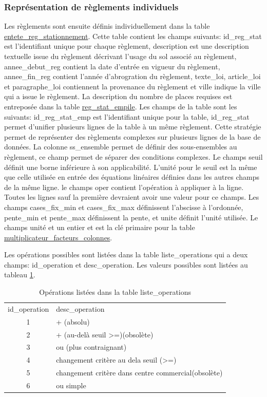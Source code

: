     \subsubsection{Représentation de règlements individuels} 
    Les règlements sont ensuite définis individuellement dans la table \underline{entete\_reg\_stationnement}. Cette table contient les champs suivants: id\_reg\_stat est l'identifiant unique pour chaque règlement, description est une description textuelle issue du règlement décrivant l'usage du sol associé au règlement, annee\_debut\_reg contient la date d'entrée en vigueur du règlement, annee\_fin\_reg contient l'année d'abrogration du règlement, texte\_loi, article\_loi et paragraphe\_loi contiennent la provenance du règlement et ville indique la ville qui a issue le règlement. La description du nombre de places requises est entreposée dans la table \underline{reg\_stat\_empile}. Les champs de la table sont les suivants: id\_reg\_stat\_emp est l'identifiant unique pour la table, id\_reg\_stat permet d'unifier plusieurs lignes de la table à un même règlement. Cette stratégie permet de représenter des règlements complexes sur plusieurs lignes de la base de données. La colonne ss\_ensemble permet de définir des sous-ensembles au règlement, ce champ permet de séparer des conditions complexes.  Le champs seuil définit une borne inférieure à son applicabilité. L'unité pour le seuil est la même que celle utilisée en entrée des équations linéaires définies dans les autres champs de la même ligne. le champs oper contient l'opération à appliquer à la ligne. Toutes les lignes sauf la première devraient avoir une valeur pour ce champs. Les champs cases\_fix\_min et cases\_fix\_max définissent l'abscisse à l'ordonnée, pente\_min et pente\_max définissent la pente, et unite définit l'unité utilisée. Le champs unité et un entier et est la clé primaire pour la table \underline{multiplicateur\_facteurs\_colonnes}. \par 
    Les opérations possibles sont listées dans la table liste\_operations qui a deux champs: id\_operation et desc\_operation. Les valeurs possibles sont listées au tableau \ref{tab:operations_table}.
    \begin{table}[h]
        \centering
        \begin{tabular}{cl}
             \hline
             id\_operation & desc\_operation  \\
             1 & + (absolu)\\
             2 & + (au-delà seuil >=)(obsolète)\\
             3 & ou (plus contraignant) \\
             4 & changement critère au dela seuil (>=)\\
             5 & changement critère dans centre commercial(obsolète)\\
             6 & ou simple \\ \hline
        \end{tabular}
        \caption{Opérations listées dans la table liste\_operations}
        \label{tab:operations_table}
    \end{table}

